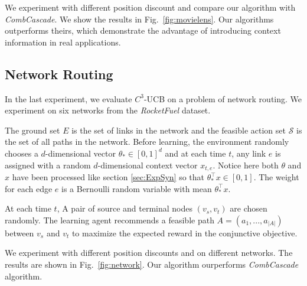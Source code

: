 \documentclass{article}
\newcommand{\cS}{\mathcal{S}}
\begin{document}
We experiment with different position discount and compare our algorithm with {\it CombCascade}. We show the results in Fig.~\ref{fig:movielens}. Our algorithms outperforms theirs, which demonstrate the advantage of introducing context information in real applications.

\subsection{Network Routing}

In the last experiment, we evaluate $C^3$-UCB on a problem of network routing. We experiment on six networks from the {\it RocketFuel} dataset\cite{spring2004measuring}.

The ground set $E$ is the set of links in the network and the feasible action set $\cS$ is the set of all paths in the network. Before learning, the environment randomly chooses a $d$-dimensional vector $\theta_* \in [0,1]^d$ and at each time $t$, any link $e$ is assigned with a random $d$-dimensional context vector $x_{t,e}$. Notice here both $\theta$ and $x$ have been processed like section \ref{sec:ExpSyn} so that $\theta_*^{\top}x \in [0,1]$. The weight for each edge $e$ is a Bernoulli random variable with mean $\theta_*^{\top}x$.

At each time $t$, A pair of source and terminal nodes $(v_s, v_t)$ are chosen randomly. The learning agent recommends a feasible path $A = (a_1,...,a_{|A|})$ between $v_s$ and $v_t$ to maximize the expected reward in the conjunctive objective.

We experiment with different position discounts and on different networks. The results are shown in Fig.~\ref{fig:network}. Our algorithm ourperforms {\it CombCascade} algorithm.



\end{document}

